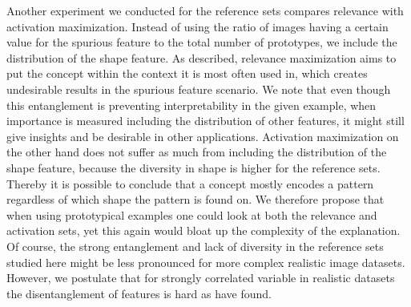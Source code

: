 Another experiment we conducted for the reference sets compares relevance with activation maximization. Instead of using the ratio of images having a certain value for the spurious feature to the total number of prototypes, we include the distribution of the shape feature. As described, relevance maximization aims to put the concept within the context it is most often used in, which creates undesirable results in the spurious feature scenario. We note that even though this entanglement is preventing interpretability in the given example, when importance is measured including the distribution of other features, it might still give insights and be desirable in other applications.
Activation maximization on the other hand does not suffer as much from including the distribution of the shape feature, because the diversity in shape is higher for the reference sets. Thereby it is possible to conclude that a concept mostly encodes a pattern regardless of which shape the pattern is found on.
We therefore propose that when using prototypical examples one could look at both the relevance and activation sets, yet this again would bloat up the complexity of the explanation. 
Of course, the strong entanglement and lack of diversity in the reference sets studied here might be less pronounced for more complex realistic image datasets. However, we postulate that for strongly correlated variable in realistic datasets the disentanglement of features is hard as \cite{Traeuble2021} have found.

